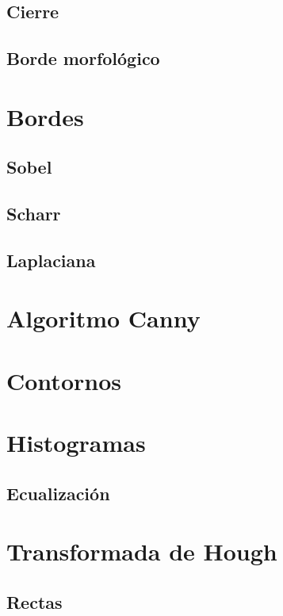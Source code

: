 \subsection{Cierre}
\subsection{Borde morfológico}

\section{Bordes}
\subsection{Sobel}
\subsection{Scharr}
\subsection{Laplaciana}

\section{Algoritmo Canny}

\section{Contornos}

\section{Histogramas}
\subsection{Ecualización}

\section{Transformada de Hough}
\subsection{Rectas}